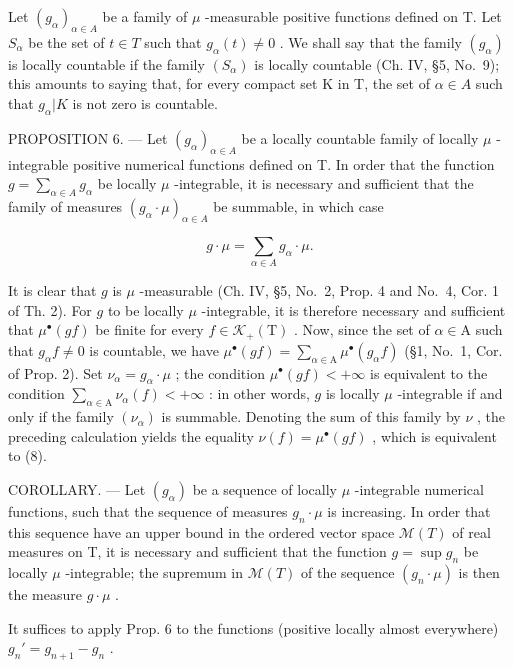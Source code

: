 Let \((g_{\alpha})_{\alpha \in A}\) be a family of \(\mu\) -measurable positive functions defined on T. Let \(S_{\alpha}\) be the set of \(t \in T\) such that \(g_{\alpha}(t) \neq 0\) . We shall say that the family \((g_{\alpha})\) is locally countable if the family \((S_{\alpha})\) is locally countable (Ch. IV, §5, No.~9); this amounts to saying that, for every compact set K in T, the set of \(\alpha \in A\) such that \(g_{\alpha}|K\) is not zero is countable.

PROPOSITION 6. --- Let \((g_{\alpha})_{\alpha \in A}\) be a locally countable family of locally \(\mu\) -integrable positive numerical functions defined on T. In order that the function \(g = \sum_{\alpha \in A} g_{\alpha}\) be locally \(\mu\) -integrable, it is necessary and sufficient that the family of measures \((g_{\alpha} \cdot \mu)_{\alpha \in A}\) be summable, in which case

\[
g \cdot \mu = \sum_ {\alpha \in A} g _ {\alpha} \cdot \mu .\tag{8}
\]

It is clear that \(g\) is \(\mu\) -measurable (Ch. IV, §5, No.~2, Prop. 4 and No.~4, Cor. 1 of Th. 2). For \(g\) to be locally \(\mu\) -integrable, it is therefore necessary and sufficient that \(\mu^{\bullet}(gf)\) be finite for every \(f \in \mathcal{K}_{+}(\mathrm{T})\) . Now, since the set of \(\alpha \in \mathrm{A}\) such that \(g_{\alpha}f \neq 0\) is countable, we have \(\mu^{\bullet}(gf) = \sum_{\alpha \in \mathrm{A}} \mu^{\bullet}(g_{\alpha}f)\) (§1, No.~1, Cor. of Prop. 2). Set \(\nu_{\alpha} = g_{\alpha} \cdot \mu\) ; the condition \(\mu^{\bullet}(gf) < +\infty\) is equivalent to the condition \(\sum_{\alpha \in \mathrm{A}} \nu_{\alpha}(f) < +\infty\) : in other words, \(g\) is locally \(\mu\) -integrable if and only if the family \((\nu_{\alpha})\) is summable. Denoting the sum of this family by \(\nu\) , the preceding calculation yields the equality \(\nu(f) = \mu^{\bullet}(gf)\) , which is equivalent to (8).

COROLLARY. --- Let \((g_{\alpha})\) be a sequence of locally \(\mu\) -integrable numerical functions, such that the sequence of measures \(g_{n} \cdot \mu\) is increasing. In order that this sequence have an upper bound in the ordered vector space \(\mathcal{M}(T)\) of real measures on T, it is necessary and sufficient that the function \(g = \sup g_{n}\) be locally \(\mu\) -integrable; the supremum in \(\mathcal{M}(T)\) of the sequence \((g_{n} \cdot \mu)\) is then the measure \(g \cdot \mu\) .

It suffices to apply Prop. 6 to the functions (positive locally almost everywhere) \(g_n' = g_{n+1} - g_n\) .

